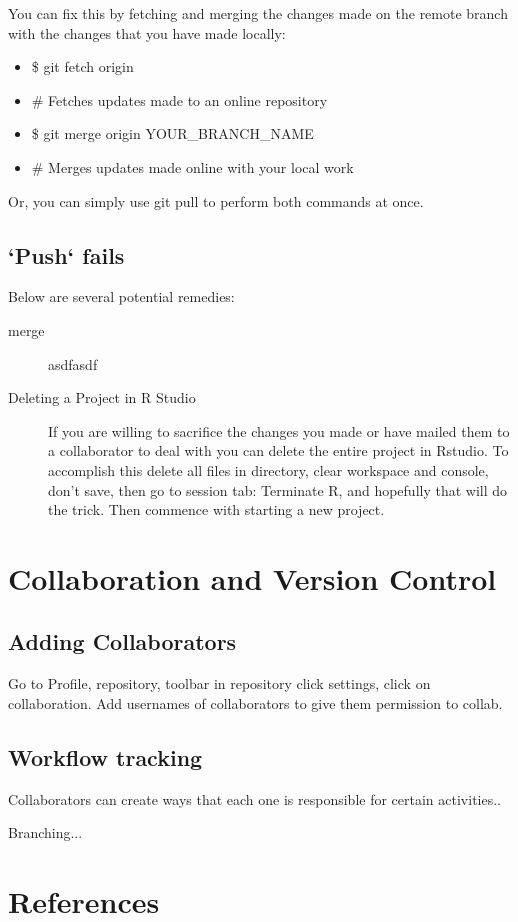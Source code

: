 \documentclass[12pt]{../SOP4_alpha}\usepackage[]{graphicx}\usepackage[]{xcolor}
\begin{document}
\NP You can fix this by fetching and merging the changes made on the remote branch with the changes that you have made locally:
\begin{itemize}
  \item \$ git fetch origin
  \item \# Fetches updates made to an online repository
  \item \$ git merge origin YOUR\_BRANCH\_NAME
  \item \# Merges updates made online with your local work
\end{itemize}

\NP Or, you can simply use git pull to perform both commands at once.



\subsection{`Push` fails}

\NP Below are several potential remedies:

\begin{description}
  \item[merge] asdfasdf
  
  \item[Deleting a Project in R Studio]If you are willing to sacrifice the changes you made or have mailed them to a collaborator to deal with you can delete the entire project in Rstudio. To accomplish this delete all files in directory, clear workspace and console, don't save, then go to session tab: Terminate R, and hopefully that will do the trick. Then commence with starting a new project. 

\end{description}



\section{Collaboration and Version Control}

\subsection{Adding Collaborators}
\NP Go to Profile, repository, toolbar in repository click settings, click on collaboration. Add usernames of collaborators to give them permission to collab.

\subsection{Workflow tracking}

\NP Collaborators can create ways that each one is responsible for certain activities..

\NP Branching...
 

\section{References}

\NP 
\end{document}
